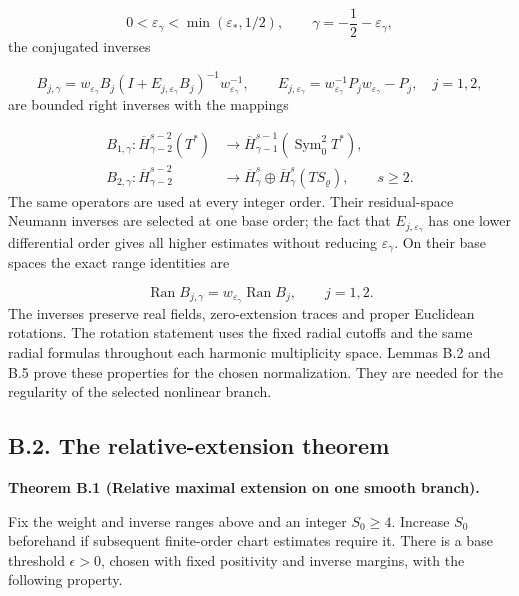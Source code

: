 \documentclass[
  english,
  11pt,
  reqno]{amsart}
\makeatletter
\newcommand{\pandocstatementheading}[1]{%
  \par\addpenalty{\@beginparpenalty}%
  \addvspace{.5\baselineskip plus .2\baselineskip minus .2\baselineskip}%
  {\normalfont\bfseries #1\par}%
  \nobreak\@afterindenttrue\@afterheading
}
\makeatother
\begin{document}
\label{eq:online-extension-selected-weight} \[
0<\varepsilon_\gamma<\min(\varepsilon_*,1/2),
\qquad \gamma=-\frac12-\varepsilon_\gamma,
\] the conjugated inverses

\label{eq:online-extension-fixed-conjugated-inverses} \[
B_{j,\gamma}
=w_{\varepsilon_\gamma} B_j(I+E_{j,\varepsilon_\gamma}B_j)^{-1}w_{\varepsilon_\gamma}^{-1},
\qquad
E_{j,\varepsilon_\gamma}=w_{\varepsilon_\gamma}^{-1}P_jw_{\varepsilon_\gamma}-P_j,
\quad j=1,2,
\] are bounded right inverses with the mappings

\label{eq:online-extension-inverse-domains} \[
\begin{aligned}
B_{1,\gamma}:\overline H^{s-2}_{\gamma-2}(T^*)
&\longrightarrow
\overline H^{s-1}_{\gamma-1}(\operatorname{Sym}^2_0T^*),\\
B_{2,\gamma}:\overline H^{s-2}_{\gamma-2}
&\longrightarrow
\overline H^s_\gamma\oplus
\overline H^s_\gamma(TS_\varrho),
\qquad s\ge2.
\end{aligned}
\] The same operators are used at every integer order. Their
residual-space Neumann inverses are selected at one base order; the fact
that \(E_{j,\varepsilon_\gamma}\) has one lower differential order gives
all higher estimates without reducing \(\varepsilon_\gamma\). On their
base spaces the exact range identities are

\label{eq:online-extension-exact-ranges} \[
\operatorname{Ran}B_{j,\gamma}
=w_{\varepsilon_\gamma}\operatorname{Ran}B_j,
\qquad j=1,2.
\] The inverses preserve real fields, zero-extension traces and proper
Euclidean rotations. The rotation statement uses the fixed radial
cutoffs and the same radial formulas throughout each harmonic
multiplicity space. Lemmas B.2 and B.5 prove these properties for the
chosen normalization. They are needed for the regularity of the selected
nonlinear branch.

\subsection{B.2. The relative-extension
theorem}\label{b.2.-the-relative-extension-theorem}\label{sec:online-extension-common-branch}

\pandocstatementheading{\leavevmode{}\label{thm:online-relative-extension-one-branch}Theorem B.1 (Relative maximal extension on one smooth branch).}

Fix the weight and inverse ranges above and an integer \(S_0\ge4\).
Increase \(S_0\) beforehand if subsequent finite-order chart estimates
require it. There is a base threshold \(\epsilon>0\), chosen with fixed
positivity and inverse margins, with the following property.
\end{document}
